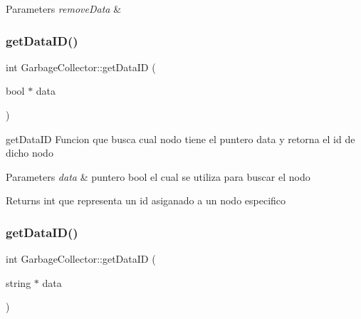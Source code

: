 \begin{DoxyParams}{Parameters}
{\em remove\+Data} & \\
\hline
\end{DoxyParams}
\mbox{\label{class_garbage_collector_a2a37351f10e4c5814ba05f0671c867cf}} 
\subsubsection{\texorpdfstring{get\+Data\+I\+D()}{getDataID()}\hspace{0.1cm}{\footnotesize\ttfamily [1/3]}}
{\footnotesize\ttfamily int Garbage\+Collector\+::get\+Data\+ID (\begin{DoxyParamCaption}\item[{bool $\ast$}]{data }\end{DoxyParamCaption})}



get\+Data\+ID Funcion que busca cual nodo tiene el puntero data y retorna el id de dicho nodo 


\begin{DoxyParams}{Parameters}
{\em data} & puntero bool el cual se utiliza para buscar el nodo \\
\hline
\end{DoxyParams}
\begin{DoxyReturn}{Returns}
int que representa un id asiganado a un nodo especifico 
\end{DoxyReturn}
\mbox{\label{class_garbage_collector_a2c349aea0136c2e986a5aef3a2335470}} 
\subsubsection{\texorpdfstring{get\+Data\+I\+D()}{getDataID()}\hspace{0.1cm}{\footnotesize\ttfamily [2/3]}}
{\footnotesize\ttfamily int Garbage\+Collector\+::get\+Data\+ID (\begin{DoxyParamCaption}\item[{string $\ast$}]{data }\end{DoxyParamCaption})}



